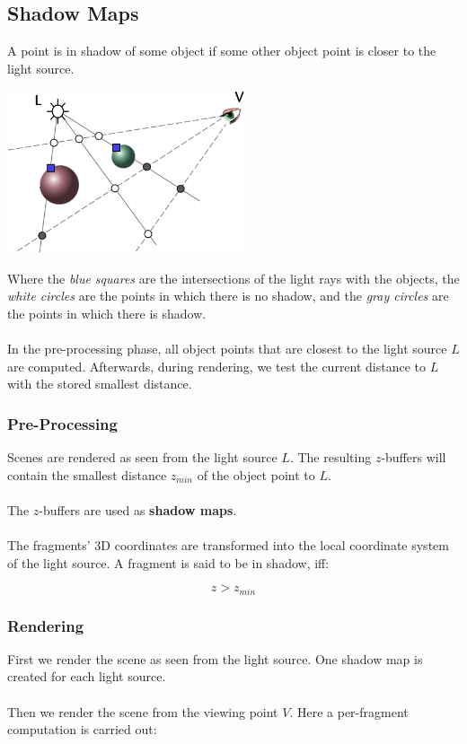 \documentclass{article}
\begin{document}
\subsection{Shadow Maps}
A point is in shadow of some object if some other object point is closer to the light source. \\

\begin{center}
	\includegraphics[width=7cm]{shadow_map.png}
\end{center}
\vspace{.3cm}
Where the \textit{blue squares} are the intersections of the light rays with the objects, the \textit{white circles} are the points in which there is no shadow, and the \textit{gray circles} are the points in which there is shadow. \\ \\
In the pre-processing phase, all object points that are closest to the light source $L$ are computed. Afterwards, during rendering, we test the current distance to $L$ with the stored smallest distance.

\subsubsection{Pre-Processing}
Scenes are rendered as seen from the light source $L$. The resulting $z$-buffers will contain the smallest distance $z_{min}$ of the object point to $L$. \\ \\
The $z$-buffers are used as \textbf{shadow maps}. \\ \\
The fragments' 3D coordinates are transformed into the local coordinate system of the light source. A fragment is said to be in shadow, iff:

\[ z > z_{min} \]

\subsubsection{Rendering}
First we render the scene as seen from the light source. One shadow map is created for each light source. \\ \\
Then we render the scene from the viewing point $V$. Here a per-fragment computation is carried out:
\end{document}
